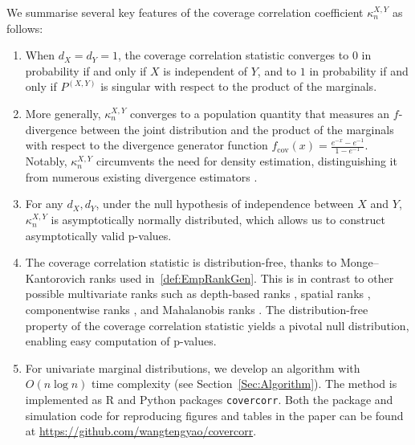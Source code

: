 \documentclass[11pt]{article}
\begin{document}
We summarise several key features of the coverage correlation coefficient $\kappa_n^{X, Y}$ as follows:
\begin{enumerate}
    \item When $d_X = d_Y = 1$, the coverage correlation statistic converges to $0$ in probability if and only if $X$ is independent of $Y$, and to $1$ in probability if and only if $P^{(X, Y)}$ is singular with respect to the product of the marginals. 
    \item More generally, $\kappa_n^{X,Y}$ converges to a population quantity that measures an $f$-divergence between the joint distribution and the product of the marginals with respect to the divergence generator function $f_{\mathrm{cov}}(x) = \frac{e^{-x}-e^{-1}}{1-e^{-1}}$. Notably, $\kappa_n^{X,Y}$ circumvents the need for density estimation, distinguishing it from numerous existing divergence estimators \citep[e.g.][]{rubenstein2019practical}.
    \item For any $d_X, d_Y$, under the null hypothesis of independence between $X$ and $Y$, $\kappa_n^{X,Y}$ is asymptotically normally distributed, which allows us to construct asymptotically valid p-values. 
    \item The coverage correlation statistic is distribution-free, thanks to Monge--Kantorovich ranks used in~\eqref{def:EmpRankGen}. This is in contrast to other possible multivariate ranks such as depth-based ranks \citep{tukey1975mathematics, liu1993quality, zuo2000general}, spatial ranks \citep{mottonen1995multivariate, chaudhuri1996geometric, koltchinskii1997m}, componentwise ranks \citep{hodges1955bivariate, bickel1965some}, and Mahalanobis ranks \citep{hallin2002optimal, hallin2002multivariate}. The distribution-free property of the coverage correlation statistic yields a pivotal null distribution, enabling easy computation of p-values. 
    \item For univariate marginal distributions, we develop an algorithm with $O(n \log n)$ time complexity (see Section~\ref{Sec:Algorithm}). The method is implemented as R and Python packages \texttt{covercorr}. Both the package and simulation code for reproducing figures and tables in the paper can be found at \url{https://github.com/wangtengyao/covercorr}.
\end{enumerate}
\end{document}
